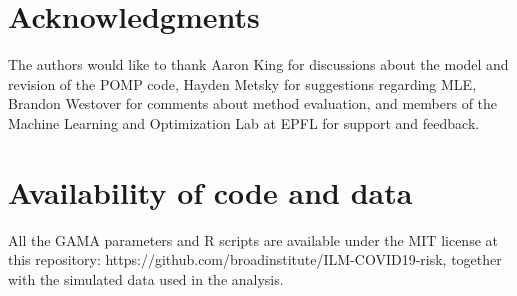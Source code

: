 \documentclass{article}
\begin{document}
\section{Acknowledgments}
The authors would like to thank Aaron King for discussions about the model and revision of the POMP code, Hayden Metsky for suggestions regarding MLE, Brandon Westover for comments about method evaluation, and members of the Machine Learning and Optimization Lab at EPFL for support and feedback.

\section{Availability of code and data}
All the GAMA parameters and R scripts are available under the MIT license at this repository: https://github.com/broadinstitute/ILM-COVID19-risk, together with the simulated data used in the analysis.

% 
% 
% 
\printbibliography
\end{document}
